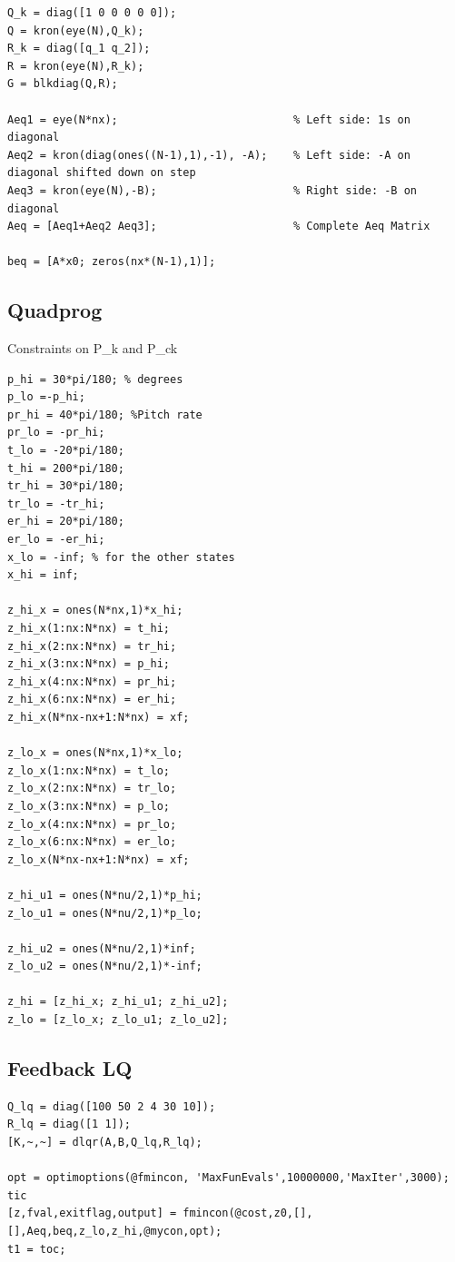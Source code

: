 \documentclass[11pt,a4paper,USenglish]{article} %
\begin{document}
\begin{verbatim}
Q_k = diag([1 0 0 0 0 0]);
Q = kron(eye(N),Q_k);
R_k = diag([q_1 q_2]);
R = kron(eye(N),R_k);
G = blkdiag(Q,R);

Aeq1 = eye(N*nx);                           % Left side: 1s on diagonal
Aeq2 = kron(diag(ones((N-1),1),-1), -A);    % Left side: -A on diagonal shifted down on step
Aeq3 = kron(eye(N),-B);                     % Right side: -B on diagonal
Aeq = [Aeq1+Aeq2 Aeq3];                     % Complete Aeq Matrix

beq = [A*x0; zeros(nx*(N-1),1)];
\end{verbatim}


\subsection*{Quadprog}

\begin{par}
Constraints on P\_k and P\_ck
\end{par} \vspace{1em}
\begin{verbatim}
p_hi = 30*pi/180; % degrees
p_lo =-p_hi;
pr_hi = 40*pi/180; %Pitch rate
pr_lo = -pr_hi;
t_lo = -20*pi/180;
t_hi = 200*pi/180;
tr_hi = 30*pi/180;
tr_lo = -tr_hi;
er_hi = 20*pi/180;
er_lo = -er_hi;
x_lo = -inf; % for the other states
x_hi = inf;

z_hi_x = ones(N*nx,1)*x_hi;
z_hi_x(1:nx:N*nx) = t_hi;
z_hi_x(2:nx:N*nx) = tr_hi;
z_hi_x(3:nx:N*nx) = p_hi;
z_hi_x(4:nx:N*nx) = pr_hi;
z_hi_x(6:nx:N*nx) = er_hi;
z_hi_x(N*nx-nx+1:N*nx) = xf;

z_lo_x = ones(N*nx,1)*x_lo;
z_lo_x(1:nx:N*nx) = t_lo;
z_lo_x(2:nx:N*nx) = tr_lo;
z_lo_x(3:nx:N*nx) = p_lo;
z_lo_x(4:nx:N*nx) = pr_lo;
z_lo_x(6:nx:N*nx) = er_lo;
z_lo_x(N*nx-nx+1:N*nx) = xf;

z_hi_u1 = ones(N*nu/2,1)*p_hi;
z_lo_u1 = ones(N*nu/2,1)*p_lo;

z_hi_u2 = ones(N*nu/2,1)*inf;
z_lo_u2 = ones(N*nu/2,1)*-inf;

z_hi = [z_hi_x; z_hi_u1; z_hi_u2];
z_lo = [z_lo_x; z_lo_u1; z_lo_u2];
\end{verbatim}


\subsection*{Feedback LQ}

\begin{verbatim}
Q_lq = diag([100 50 2 4 30 10]);
R_lq = diag([1 1]);
[K,~,~] = dlqr(A,B,Q_lq,R_lq);

opt = optimoptions(@fmincon, 'MaxFunEvals',10000000,'MaxIter',3000);
tic
[z,fval,exitflag,output] = fmincon(@cost,z0,[],[],Aeq,beq,z_lo,z_hi,@mycon,opt);
t1 = toc;
\end{verbatim}
\end{document}
